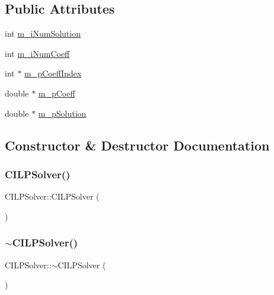 \subsection*{Public Attributes}
\begin{DoxyCompactItemize}
\item 
int \mbox{\hyperlink{classCILPSolver_ab1336a8c01cf275603252a8a9eaa17bc}{m\+\_\+i\+Num\+Solution}}
\item 
int \mbox{\hyperlink{classCILPSolver_a5577f02fe4b0afe41cc69c5ca1939f21}{m\+\_\+i\+Num\+Coeff}}
\item 
int $\ast$ \mbox{\hyperlink{classCILPSolver_a4a83cb1c09f07dcceaa1aeaf5ad99c45}{m\+\_\+p\+Coeff\+Index}}
\item 
double $\ast$ \mbox{\hyperlink{classCILPSolver_ab0682f23781fd54a978f5e705f57a93e}{m\+\_\+p\+Coeff}}
\item 
double $\ast$ \mbox{\hyperlink{classCILPSolver_a83e5070fff7375cd96ee4a2212ee041c}{m\+\_\+p\+Solution}}
\end{DoxyCompactItemize}


\subsection{Constructor \& Destructor Documentation}
\mbox{\label{classCILPSolver_aa2e61e2697edcf8f2962a7402538390f}} 
\subsubsection{\texorpdfstring{CILPSolver()}{CILPSolver()}}
{\footnotesize\ttfamily C\+I\+L\+P\+Solver\+::\+C\+I\+L\+P\+Solver (\begin{DoxyParamCaption}{ }\end{DoxyParamCaption})}

\mbox{\label{classCILPSolver_a5c6e432973cafaf8fbab69f3d9bbdafb}} 
\subsubsection{\texorpdfstring{$\sim$CILPSolver()}{~CILPSolver()}}
{\footnotesize\ttfamily C\+I\+L\+P\+Solver\+::$\sim$\+C\+I\+L\+P\+Solver (\begin{DoxyParamCaption}{ }\end{DoxyParamCaption})\hspace{0.3cm}{\ttfamily [virtual]}}



